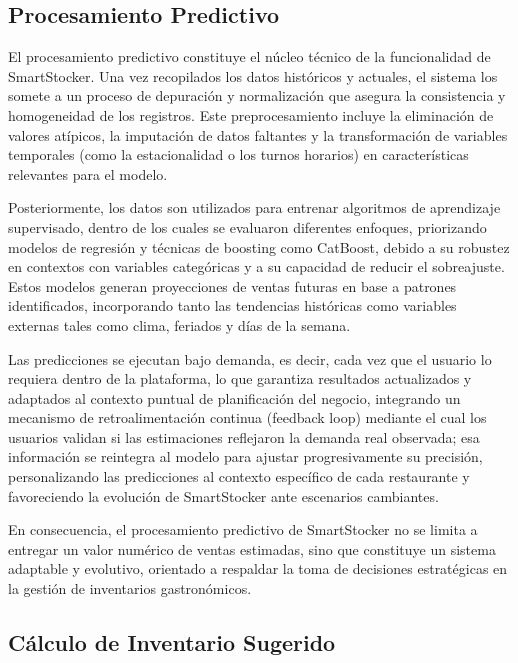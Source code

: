 \subsection{Procesamiento Predictivo}\label{sec:procesamiento-predictivo}

El procesamiento predictivo constituye el núcleo técnico de la funcionalidad de SmartStocker. Una vez recopilados los datos históricos y actuales, el sistema los somete a un proceso de depuración y normalización que asegura la consistencia y homogeneidad de los registros. Este preprocesamiento incluye la eliminación de valores atípicos, la imputación de datos faltantes y la transformación de variables temporales (como la estacionalidad o los turnos horarios) en características relevantes para el modelo.

Posteriormente, los datos son utilizados para entrenar algoritmos de aprendizaje supervisado, dentro de los cuales se evaluaron diferentes enfoques, priorizando modelos de regresión y técnicas de boosting como CatBoost, debido a su robustez en contextos con variables categóricas y a su capacidad de reducir el sobreajuste. Estos modelos generan proyecciones de ventas futuras en base a patrones identificados, incorporando tanto las tendencias históricas como variables externas tales como clima, feriados y días de la semana.

Las predicciones se ejecutan bajo demanda, es decir, cada vez que el usuario lo requiera dentro de la plataforma, lo que garantiza resultados actualizados y adaptados al contexto puntual de planificación del negocio, integrando un mecanismo de retroalimentación continua (feedback loop) mediante el cual los usuarios validan si las estimaciones reflejaron la demanda real observada; esa información se reintegra al modelo para ajustar progresivamente su precisión, personalizando las predicciones al contexto específico de cada restaurante y favoreciendo la evolución de SmartStocker ante escenarios cambiantes.

En consecuencia, el procesamiento predictivo de SmartStocker no se limita a entregar un valor numérico de ventas estimadas, sino que constituye un sistema adaptable y evolutivo, orientado a respaldar la toma de decisiones estratégicas en la gestión de inventarios gastronómicos.

\subsection{Cálculo de Inventario Sugerido}\label{sec:calculo-inventario}

